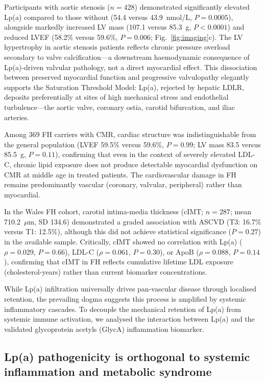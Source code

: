 \documentclass[11pt,a4paper]{article}
\newcommand{\lpa}{Lp(a)}
\newcommand{\fh}{FH}
\begin{document}
Participants with aortic stenosis ($n = 428$) demonstrated significantly elevated \lpa{} compared to those without (54.4 versus 43.9~nmol/L, $P = 0.0005$), alongside markedly increased LV mass (107.1 versus 85.3~g, $P < 0.0001$) and reduced LVEF (58.2\% versus 59.6\%, $P = 0.006$; Fig.~\ref{fig:imaging}c). The LV hypertrophy in aortic stenosis patients reflects chronic pressure overload secondary to valve calcification---a downstream haemodynamic consequence of \lpa{}-driven valvular pathology, not a direct myocardial effect. This dissociation between preserved myocardial function and progressive valvulopathy elegantly supports the Saturation Threshold Model: \lpa{}, rejected by hepatic LDLR, deposits preferentially at sites of high mechanical stress and endothelial turbulence---the aortic valve, coronary ostia, carotid bifurcation, and iliac arteries.

Among 369 \fh{} carriers with CMR, cardiac structure was indistinguishable from the general population (LVEF 59.5\% versus 59.6\%, $P = 0.99$; LV mass 83.5 versus 85.5~g, $P = 0.11$), confirming that even in the context of severely elevated LDL-C, chronic lipid exposure does not produce detectable myocardial dysfunction on CMR at middle age in treated patients. The cardiovascular damage in FH remains predominantly vascular (coronary, valvular, peripheral) rather than myocardial.

In the Wales FH cohort, carotid intima-media thickness (cIMT; $n = 287$; mean 710.2~$\mu$m, SD 134.6) demonstrated a graded association with ASCVD (T3: 16.7\% versus T1: 12.5\%), although this did not achieve statistical significance ($P = 0.27$) in the available sample. Critically, cIMT showed no correlation with \lpa{} ($\rho = 0.029$, $P = 0.66$), LDL-C ($\rho = 0.061$, $P = 0.30$), or ApoB ($\rho = 0.088$, $P = 0.14$), confirming that cIMT in FH reflects cumulative lifetime LDL exposure (cholesterol-years) rather than current biomarker concentrations\cite{genedy2026,sijbrands2004}.

While \lpa{} infiltration universally drives pan-vascular disease through localised retention, the prevailing dogma suggests this process is amplified by systemic inflammatory cascades. To decouple the mechanical retention of \lpa{} from systemic immune activation, we analysed the interaction between \lpa{} and the validated glycoprotein acetyls (GlycA) inflammation biomarker.

\subsection*{\lpa{} pathogenicity is orthogonal to systemic inflammation and metabolic syndrome}
\end{document}
